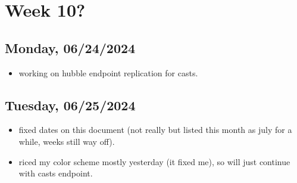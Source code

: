 \newpage
\section{Week 10?}
\subsection*{Monday, 06/24/2024}
\begin{itemize}
    \item working on hubble endpoint replication for casts. 
\end{itemize}

\subsection*{Tuesday, 06/25/2024}
\begin{itemize}
    \item fixed dates on this document (not really but listed this month as july
        for a while, weeks still way off).
    \item riced my color scheme mostly yesterday (it fixed me), so will just
        continue with casts endpoint. 
\end{itemize}
